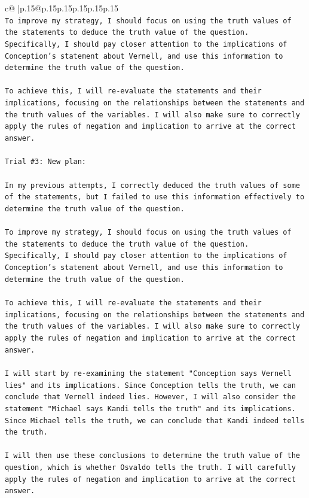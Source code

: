 \documentclass{article}
\begin{document}
{\begin{supertabular}{c@{$\;$}|p{.15\linewidth}@{}p{.15\linewidth}p{.15\linewidth}p{.15\linewidth}p{.15\linewidth}p{.15\linewidth}}
{{{\\ 
\texttt{To improve my strategy, I should focus on using the truth values of the statements to deduce the truth value of the question. Specifically, I should pay closer attention to the implications of Conception's statement about Vernell, and use this information to determine the truth value of the question.} \\
\\ 
\texttt{To achieve this, I will re{-}evaluate the statements and their implications, focusing on the relationships between the statements and the truth values of the variables. I will also make sure to correctly apply the rules of negation and implication to arrive at the correct answer.} \\
\\ 
\texttt{Trial \#3: New plan: } \\
\\ 
\texttt{In my previous attempts, I correctly deduced the truth values of some of the statements, but I failed to use this information effectively to determine the truth value of the question. } \\
\\ 
\texttt{To improve my strategy, I should focus on using the truth values of the statements to deduce the truth value of the question. Specifically, I should pay closer attention to the implications of Conception's statement about Vernell, and use this information to determine the truth value of the question.} \\
\\ 
\texttt{To achieve this, I will re{-}evaluate the statements and their implications, focusing on the relationships between the statements and the truth values of the variables. I will also make sure to correctly apply the rules of negation and implication to arrive at the correct answer.} \\
\\ 
\texttt{I will start by re{-}examining the statement "Conception says Vernell lies" and its implications. Since Conception tells the truth, we can conclude that Vernell indeed lies. However, I will also consider the statement "Michael says Kandi tells the truth" and its implications. Since Michael tells the truth, we can conclude that Kandi indeed tells the truth.} \\
\\ 
\texttt{I will then use these conclusions to determine the truth value of the question, which is whether Osvaldo tells the truth. I will carefully apply the rules of negation and implication to arrive at the correct answer.} \\
}}}
\end{supertabular}}
\end{document}
